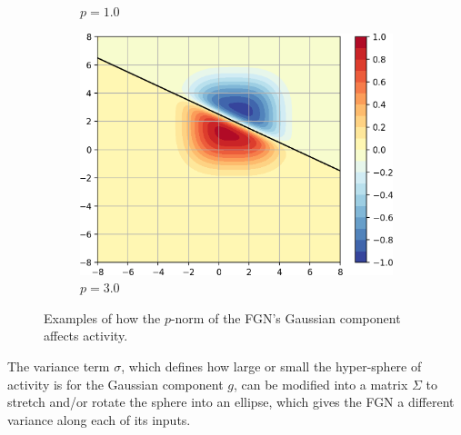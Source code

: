 \documentclass[12pt,oneside]{CUNY_PhD}
\begin{document}
\begin{figure}[!t]
\begin{subfigure}[t]{0.32\textwidth}
        \caption*{$p=1.0$}
    \end{subfigure}
    \begin{subfigure}[t]{0.32\textwidth}
        \includegraphics[width=\textwidth]{images/Variants-Norms/ord3-cropped.png}
        \caption*{$p=3.0$}
    \end{subfigure}
    \caption{Examples of how the $p$-norm of the FGN's Gaussian component affects activity.}
    \label{fig:norms}
\end{figure}

The variance term $\sigma$, which defines how large or small the hyper-sphere of activity is for the Gaussian component $g$, can be modified into a matrix $\Sigma$ to stretch and/or rotate the sphere into an ellipse, which gives the FGN a different variance along each of its inputs.
\end{document}
